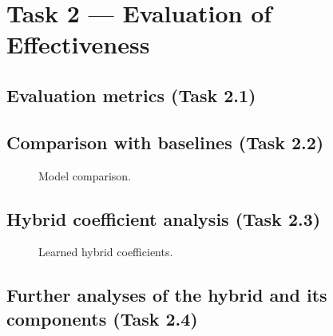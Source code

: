 \section{Task 2 --- Evaluation of Effectiveness}
\label{sec:task2}

\subsection{Evaluation metrics (Task 2.1)}

\subsection{Comparison with baselines (Task 2.2)}

\begin{table}[htbp]
  \centering
  \caption{Accuracy and beyond-accuracy results per model.}
  \label{tab:model-results}
\end{table}

\begin{figure}[htbp]
  \centering
  \caption{Model comparison.}
  \label{fig:model-comparison}
\end{figure}

\subsection{Hybrid coefficient analysis (Task 2.3)}

\begin{figure}[htbp]
  \centering
  \caption{Learned hybrid coefficients.}
  \label{fig:hybrid-coefficients}
\end{figure}

\subsection{Further analyses of the hybrid and its components (Task 2.4)}

